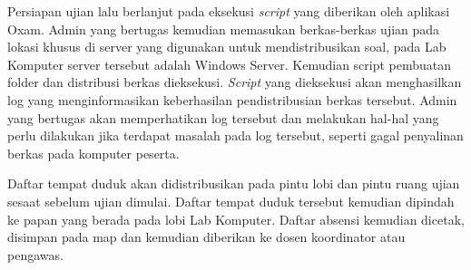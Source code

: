         Persiapan ujian lalu berlanjut pada eksekusi \textit{script} yang
        diberikan oleh aplikasi Oxam. Admin yang bertugas kemudian memasukan
        berkas-berkas ujian pada lokasi khusus di server yang digunakan
        untuk mendistribusikan soal, pada Lab Komputer server tersebut adalah Windows Server.
        Kemudian script pembuatan folder dan distribusi berkas dieksekusi.
        \textit{Script} yang dieksekusi akan menghasilkan log yang
        menginformasikan keberhasilan pendistribusian berkas tersebut. Admin
        yang bertugas akan memperhatikan log tersebut dan melakukan hal-hal yang
        perlu dilakukan jika terdapat masalah pada log tersebut, seperti gagal penyalinan
        berkas pada komputer peserta.
        
        Daftar tempat duduk akan didistribusikan pada pintu lobi dan pintu ruang
        ujian sesaat sebelum ujian dimulai. Daftar tempat duduk tersebut kemudian dipindah
        ke papan yang berada pada lobi Lab Komputer.
        Daftar absensi kemudian dicetak, disimpan pada map
        dan kemudian diberikan ke dosen koordinator atau pengawas.
    
